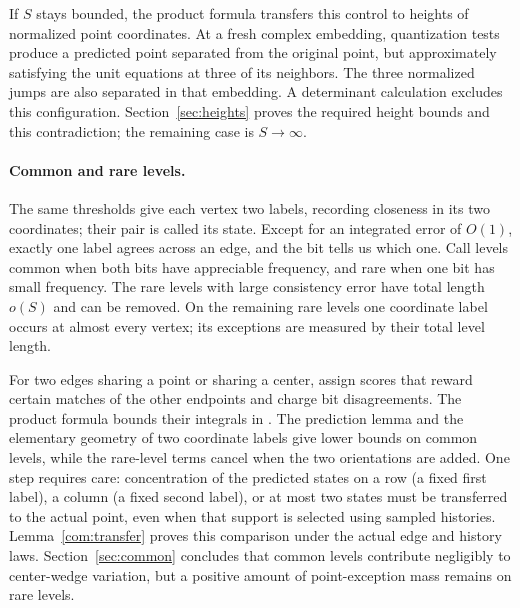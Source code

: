 If \(S\) stays bounded, the product formula transfers this control
to heights of normalized point coordinates. At a fresh complex
embedding, quantization tests produce a predicted point separated
from the original point, but approximately satisfying the unit
equations at three of its neighbors. The three normalized jumps are
also separated in that embedding. A determinant calculation excludes
this configuration. Section~\ref{sec:heights} proves the required
height bounds and this contradiction; the remaining case is
\(S\to\infty\).

\paragraph{Common and rare levels.}
The same thresholds give each vertex two labels, recording closeness
in its two coordinates; their pair is called its state.
Except for an integrated error of \(O(1)\),
exactly one label agrees across an edge, and the bit tells us which one.
Call levels common when both bits have appreciable frequency, and
rare when one bit has small frequency. The rare levels with large
consistency error have total length \(o(S)\) and can be removed.
On the remaining rare levels one coordinate label occurs at almost
every vertex; its exceptions are measured by their total level length.

For two edges sharing a point or sharing a center, assign scores that
reward certain matches of the other endpoints and charge bit
disagreements. The product formula bounds their integrals in
. The prediction lemma and the elementary geometry
of two coordinate labels give lower bounds on common levels, while
the rare-level terms cancel when the two orientations are added.
One step requires care: concentration of the predicted states on a
row (a fixed first label), a column (a fixed second label), or at most
two states must be transferred to the actual point, even when that
support is selected using sampled histories. Lemma~\ref{com:transfer}
proves this comparison under the actual edge and history laws.
Section~\ref{sec:common} concludes that common levels contribute
negligibly to center-wedge variation, but a positive amount of
point-exception mass remains on rare levels.


